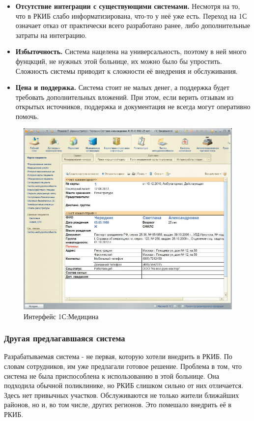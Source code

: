 \documentclass[a4paper,article]{article}
\begin{document}
        \begin{itemize}[nolistsep]
            \item \textbf{Отсутствие интеграции с существующими системами.} Несмотря на то, что в РКИБ слабо информатизирована, что-то у неё уже есть. Переход на 1С означает отказ от практически всего разработано ранее, либо дополнительные затраты на интеграцию.
            \item \textbf{Избыточность.} Система нацелена на универсальность, поэтому в ней много фунцкций, не нужных этой больнице, их можно было бы упростить. Сложность системы приводит к сложности её внедрения и обслуживания.
            \item \textbf{Цена и поддержка.} Система стоит не малых денег, а поддержка будет требовать дополнительных вложений. При этом, если верить отзывам из открытых источников, поддержка и документация не всегда могут оперативно помочь.
        \end{itemize}

        \begin{figure}[h]

            \centering

            \includegraphics[width=0.6\linewidth]{Интерфейс 1С:Медицина.png}

            \caption{\centering Интерфейс 1С:Медицина}

            \label{fig:Интерфейс 1С:Медицина}

        \end{figure}

    \subsubsection{Другая предлагавшаяся система}

        Разрабатываемая система - не первая, которую хотели внедрить в РКИБ. По словам сотрудников, им уже предлагали готовое решение. Проблема в том, что система не была приспособлена к использованию в этой больнице. Она подходила обычной поликлинике, но РКИБ слишком сильно от них отличается. Здесь нет привычных участков. Обслуживаются не только жители ближайших районов, но и, во том числе, других регионов. Это помешало внедрить её в РКИБ.
\end{document}
